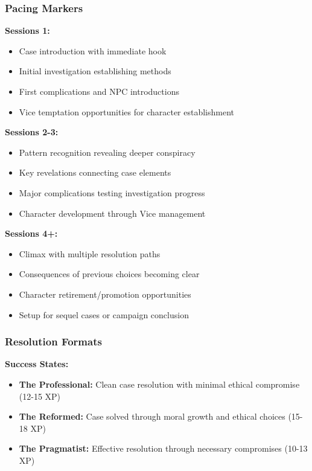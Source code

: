 \documentclass[11pt]{article}
\begin{document}
\subsubsection{Pacing Markers}

\textbf{Sessions 1:}
\begin{itemize}
\item Case introduction with immediate hook
\item Initial investigation establishing methods
\item First complications and NPC introductions
\item Vice temptation opportunities for character establishment
\end{itemize}

\textbf{Sessions 2-3:}
\begin{itemize}
\item Pattern recognition revealing deeper conspiracy
\item Key revelations connecting case elements
\item Major complications testing investigation progress
\item Character development through Vice management
\end{itemize}

\textbf{Sessions 4+:}
\begin{itemize}
\item Climax with multiple resolution paths
\item Consequences of previous choices becoming clear
\item Character retirement/promotion opportunities
\item Setup for sequel cases or campaign conclusion
\end{itemize}

\subsubsection{Resolution Formats}

\textbf{Success States:}
\begin{itemize}
\item \textbf{The Professional:} Clean case resolution with minimal ethical compromise (12-15 XP)
\item \textbf{The Reformed:} Case solved through moral growth and ethical choices (15-18 XP)
\item \textbf{The Pragmatist:} Effective resolution through necessary compromises (10-13 XP)
\end{itemize}
\end{document}
